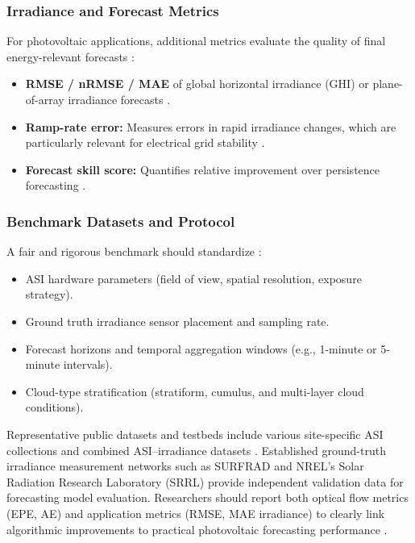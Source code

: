 \subsubsection{Irradiance and Forecast Metrics}
For photovoltaic applications, additional metrics evaluate the quality of final energy-relevant forecasts \cite{zhang2015,yang2020}:
\begin{itemize}
  \item \textbf{RMSE / nRMSE / MAE} of global horizontal irradiance (GHI) or plane-of-array irradiance forecasts \cite{zhang2015}.
  \item \textbf{Ramp-rate error:} Measures errors in rapid irradiance changes, which are particularly relevant for electrical grid stability \cite{nouri2024ramp}.
  \item \textbf{Forecast skill score:} Quantifies relative improvement over persistence forecasting \cite{yang2020,voyant2018}.
\end{itemize}

\subsubsection{Benchmark Datasets and Protocol}
A fair and rigorous benchmark should standardize \cite{baker2011,nie2024}:
\begin{itemize}
  \item ASI hardware parameters (field of view, spatial resolution, exposure strategy).
  \item Ground truth irradiance sensor placement and sampling rate.
  \item Forecast horizons and temporal aggregation windows (e.g., 1-minute or 5-minute intervals).
  \item Cloud-type stratification (stratiform, cumulus, and multi-layer cloud conditions).
\end{itemize}

Representative public datasets and testbeds include various site-specific ASI collections and combined ASI--irradiance datasets \cite{urquhart2016,qin2022cloudcast,nouri2021skycam,nie2024}. Established ground-truth irradiance measurement networks such as SURFRAD \cite{augustine2000} and NREL's Solar Radiation Research Laboratory (SRRL) \cite{stoffel1981} provide independent validation data for forecasting model evaluation. Researchers should report both optical flow metrics (EPE, AE) and application metrics (RMSE, MAE irradiance) to clearly link algorithmic improvements to practical photovoltaic forecasting performance \cite{yang2020,logothetis2022}.

